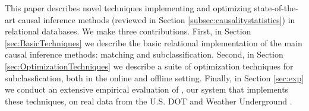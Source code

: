 
\vspace{-0.1cm}

This paper describes novel techniques implementing and optimizing
state-of-the-art causal inference methods
(reviewed in Section \ref{subsec:causalitystatistics}) in relational databases.
We make three contributions.
First, in Section \ref{sec:BasicTechniques}
we describe the basic relational implementation of the main causal inference methods: matching and subclassification.
Second, in Section \ref{sec:OptimizationTechniques}
we describe a suite of optimization techniques for subclassfication, both in the online and offline setting.
Finally, in Section \ref{sec:exp}
we conduct an extensive empirical evaluation of \GSQL, our system that implements these techniques,
on real data from the U.S. DOT and Weather Underground \cite{flightdata,Weatherdata}.



\vspace{-2mm}
